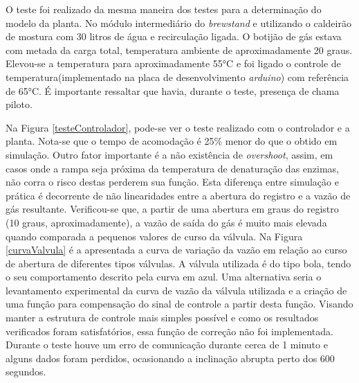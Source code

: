 O teste foi realizado da mesma maneira dos testes para a determinação do modelo da planta. No módulo intermediário do \textit{brewstand} e utilizando o caldeirão de mostura com 30 litros de água e recirculação ligada. O botijão de gás estava com metada da carga total, temperatura ambiente de aproximadamente 20 graus. Elevou-se a temperatura para aproximadamente 55°C e foi ligado o controle de temperatura(implementado na placa de desenvolvimento \textit{arduino}) com referência de 65°C. É importante ressaltar que havia, durante o teste, presença de chama piloto. 

Na Figura \ref{testeControlador}, pode-se ver o teste realizado com o controlador e a planta. Nota-se que o tempo de acomodação é 25\% menor do que o obtido em simulação. Outro fator importante é a não existência de \textit{overshoot}, assim, em casos onde a rampa seja próxima da temperatura de denaturação das enzimas, não corra o risco destas perderem sua função. Esta diferença entre simulação e prática é decorrente de não linearidades entre a abertura do registro e a vazão de gás resultante. Verificou-se que, a partir de uma abertura em graus do registro (10 graus, aproximadamente), a vazão de saída do gás é muito mais elevada quando comparada a pequenos valores de curso da válvula. Na Figura \ref{curvaValvula} é a apresentada a curva de variação da vazão em relação ao curso de abertura de diferentes tipos válvulas. A válvula utilizada é do tipo bola, tendo o seu comportamento descrito pela curva em azul. Uma alternativa seria o levantamento experimental da curva de vazão da válvula utilizada e a criação de uma função para compensação do sinal de controle a partir desta função. Visando manter a estrutura de controle mais simples possível e como os resultados verificados foram satisfatórios, essa função de correção não foi implementada. Durante o teste houve um erro de comunicação durante cerca de 1 minuto e alguns dados foram perdidos, ocasionando a inclinação abrupta perto dos 600 segundos.  


